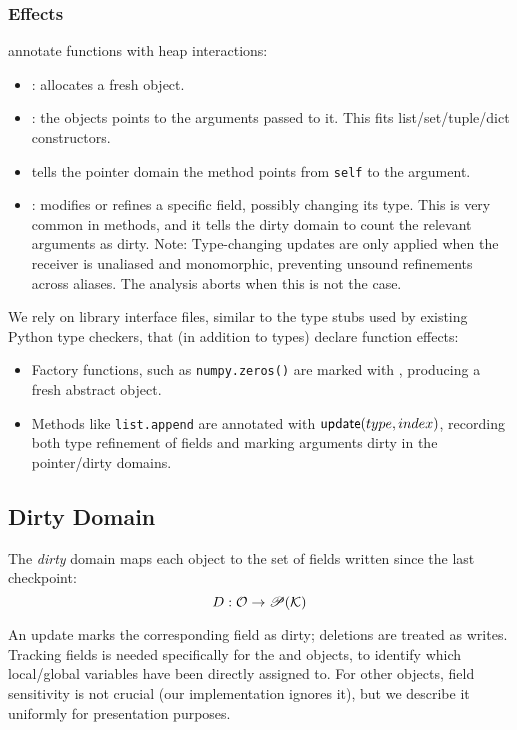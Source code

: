 \subsubsection{Effects} annotate functions with heap interactions:
\begin{itemize}
  \item \tnew: allocates a fresh object.
  \item \tptstoargs: the \tnew objects points to the arguments passed to it. This fits list/set/tuple/dict constructors.
  \item \tboundmeth tells the pointer domain the method points from \texttt{self} to the argument.
  \item \tupdate: modifies or refines a specific field, possibly changing its type. This is very common in methods, and it tells the dirty domain to count the relevant arguments as dirty. Note: Type-changing updates are only applied when the receiver is unaliased and monomorphic, preventing unsound refinements across aliases. The analysis aborts when this is not the case.
\end{itemize}

We rely on library interface files, similar to the type stubs used by existing Python type checkers, that (in addition to types) declare function effects:

\begin{itemize}
  \item Factory functions, such as \texttt{numpy.zeros()} are marked with \tnew, producing a fresh abstract object.
  \item Methods like \texttt{list.append} are annotated with $\textsf{update}(type, index)$, recording both type refinement of fields and marking arguments dirty in the pointer/dirty domains.
\end{itemize}

\subsection{Dirty Domain}
The \emph{dirty} domain maps each object to the set of fields written since the last checkpoint:
\[D : \mathcal{O} \to \mathscr{P}(\mathcal{K})\]

An update marks the corresponding field as dirty; deletions are treated as writes. 
Tracking fields is needed specifically for the \tLOCALS and \tGLOBALS objects, to identify which local/global variables have been directly assigned to.
For other objects, field sensitivity is not crucial (our implementation ignores it),
but we describe it uniformly for presentation purposes.

